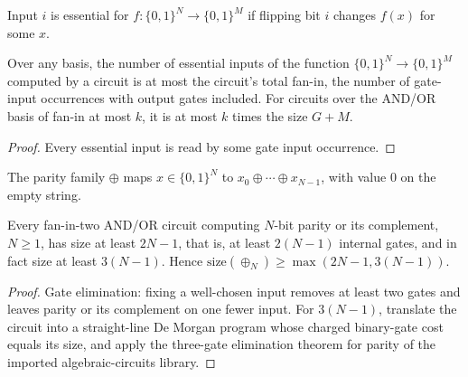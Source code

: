 \begin{definition}
  \label{def:lowerbounds-essential}
  \leanok
  Input $i$ is essential for $f : \{0,1\}^N \to \{0,1\}^M$ if flipping bit $i$
  changes $f(x)$ for some $x$.
\end{definition}

\begin{theorem}
  \label{thm:lowerbounds-essential}
  \leanok
  Over any basis, the number of essential inputs of the function
  $\{0,1\}^N \to \{0,1\}^M$ computed by a circuit is at most the circuit's
  total fan-in, the number of gate-input occurrences with output gates
  included. For circuits over the AND/OR basis of fan-in at most $k$, it is at
  most $k$ times the size $G + M$.
\end{theorem}
\begin{proof}
  \leanok
  Every essential input is read by some gate input occurrence.
\end{proof}

\begin{definition}[Parity]
  \label{def:lowerbounds-parity}
  \leanok
  The parity family $\oplus$ maps $x \in \{0,1\}^N$ to
  $x_0 \oplus \cdots \oplus x_{N-1}$, with value $0$ on the empty string.
\end{definition}

\begin{theorem}[Schnorr]
  \label{thm:lowerbounds-schnorr}
  \leanok
  Every fan-in-two AND/OR circuit computing $N$-bit parity or its complement,
  $N \ge 1$, has size at least $2N - 1$, that is, at least $2(N - 1)$ internal
  gates, and in fact size at least $3(N - 1)$. Hence
  $\mathrm{size}(\oplus_N) \ge \max(2N - 1, 3(N - 1))$.
\end{theorem}
\begin{proof}
  \leanok
  Gate elimination: fixing a well-chosen input removes at least two gates and
  leaves parity or its complement on one fewer input. For $3(N-1)$, translate
  the circuit into a straight-line De Morgan program whose charged binary-gate
  cost equals its size, and apply the three-gate elimination theorem for parity
  of the imported algebraic-circuits library.
\end{proof}

